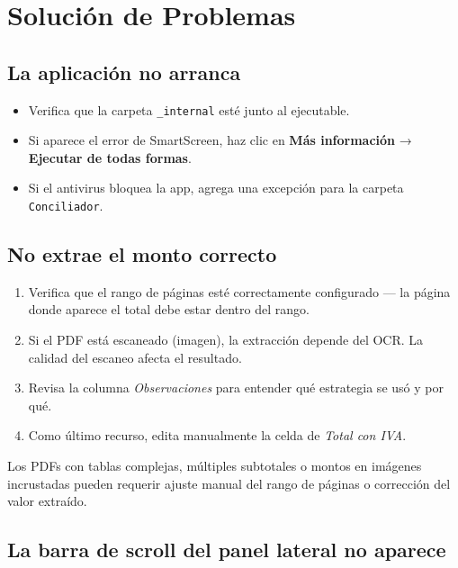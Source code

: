 \documentclass[12pt, a4paper, oneside]{report}
\newcommand{\campo}[1]{\textit{#1}}
\begin{document}
\chapter{Solución de Problemas}

\section{La aplicación no arranca}

\begin{itemize}
  \item Verifica que la carpeta \texttt{\_internal} esté junto al ejecutable.
  \item Si aparece el error de SmartScreen, haz clic en \textbf{Más información}
        → \textbf{Ejecutar de todas formas}.
  \item Si el antivirus bloquea la app, agrega una excepción para la carpeta
        \texttt{Conciliador}.
\end{itemize}

\section{No extrae el monto correcto}

\begin{enumerate}
  \item Verifica que el rango de páginas esté correctamente configurado —
        la página donde aparece el total debe estar dentro del rango.
  \item Si el PDF está escaneado (imagen), la extracción depende del OCR.
        La calidad del escaneo afecta el resultado.
  \item Revisa la columna \campo{Observaciones} para entender qué estrategia
        se usó y por qué.
  \item Como último recurso, edita manualmente la celda de \campo{Total con IVA}.
\end{enumerate}

\begin{warningbox}
Los PDFs con tablas complejas, múltiples subtotales o montos en imágenes
incrustadas pueden requerir ajuste manual del rango de páginas o corrección
del valor extraído.
\end{warningbox}

\section{La barra de scroll del panel lateral no aparece}
\end{document}
